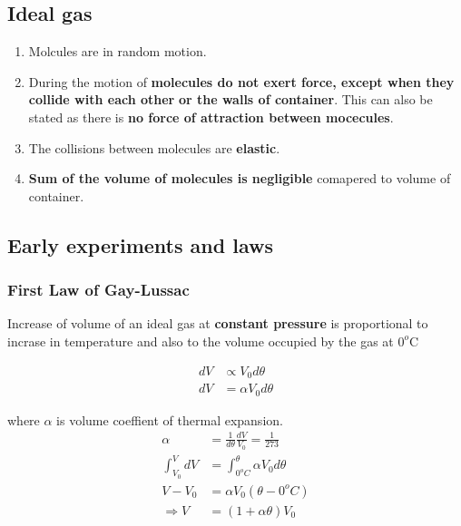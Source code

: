 \documentclass[fleqn,10pt]{SelfArx} %
\begin{document}
\subsection{Ideal gas}
\begin{enumerate}[noitemsep]
    \item Molcules are in random motion. 
    \item During the motion of \textbf{molecules do not exert force, except when they collide with each other} \textbf{or the walls of container}. This can also be stated as there is \textbf{no force of attraction between mocecules}.
    \item The collisions between molecules are \textbf{elastic}.
    \item \textbf{Sum of the volume of molecules is negligible} comapered to volume of container.
\end{enumerate}

\subsection{Early experiments and laws}
\subsubsection*{First Law of Gay-Lussac}
Increase of volume of an ideal gas at \textbf{constant pressure} is proportional to incrase in temperature and also to the volume occupied by the gas at $0^o$C

\begin{align}
    dV &\propto V_0 d\theta \\
    dV &= \alpha V_0 d\theta
\end{align}

where $\alpha$ is volume coeffient of thermal expansion.
\begin{align}
    \alpha &= \frac{1}{d \theta} \frac{dV}{V_0} = \frac{1}{273} \\
    \int_{V_0}^{V} dV &= \int_{0^oC}^{\theta} \alpha V_0 d\theta \\
    V - V_0 &= \alpha V_0(\theta - 0^oC) \\
    \Rightarrow V &= (1+\alpha\theta)V_0
\end{align}
\end{document}

